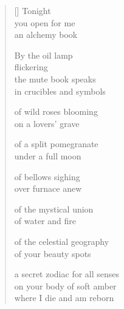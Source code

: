 \documentclass[12pt,a4paper]{article}
\begin{document}

\newpage

\poemtitle{}

\settowidth{\versewidth}{on your body of soft amber}

\bigskip

\begin{verse}[\versewidth]
  Tonight \\
  you open for me \\
  an alchemy book

  By the oil lamp \\
  flickering \\
  the mute book speaks \\
  in crucibles and symbols

  of wild roses blooming \\
  on a lovers' grave

  of a split pomegranate \\
  under a full moon

  of bellows sighing \\
  over furnace anew

  of the mystical union \\
  of water and fire

  of the celestial geography \\
  of your beauty spots

  a secret zodiac for all senses \\
  on your body of soft amber \\
  where I die and am reborn
\end{verse}


\newpage

\poemtitle{}

\settowidth{\versewidth}{and our breaths like geysers}

\bigskip
\end{document}
